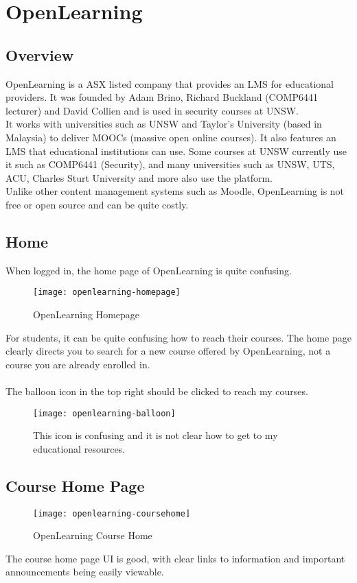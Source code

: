 
\section{OpenLearning}
\subsection{Overview}
OpenLearning is a ASX listed company that provides an LMS for educational providers. It was founded by Adam Brino, Richard Buckland (COMP6441 lecturer) and David Collien and is used in security courses at UNSW.\\
It works with universities such as UNSW and Taylor's University (based in Malaysia) to deliver MOOCs (massive open online courses). It also features an LMS that educational institutions can use. Some courses at UNSW currently use it such as COMP6441 (Security), and many universities such as UNSW, UTS, ACU, Charles Sturt University and more also use the platform.\\
Unlike other content management systems such as Moodle, OpenLearning is not free or open source and can be quite costly.\\

\subsection{Home}
When logged in, the home page of OpenLearning is quite confusing.\\
\begin{figure}[h!]
    \centering
    \texttt{[image: openlearning-homepage]}
    \caption{OpenLearning Homepage}
\end{figure}

For students, it can be quite confusing how to reach their courses. The home page clearly directs you to search for a new course offered by OpenLearning, not a course you are already enrolled in. \\
\\
The balloon icon in the top right should be clicked to reach my courses. \\
\begin{figure}[h!]
    \centering
    \texttt{[image: openlearning-balloon]}
    \caption{This icon is confusing and it is not clear how to get to my educational resources.}
\end{figure}

\subsection{Course Home Page}
\begin{figure}[h!]
    \centering
    \texttt{[image: openlearning-coursehome]}
    \caption{OpenLearning Course Home}
\end{figure}
The course home page UI is good, with clear links to information and important announcements being easily viewable.\\

